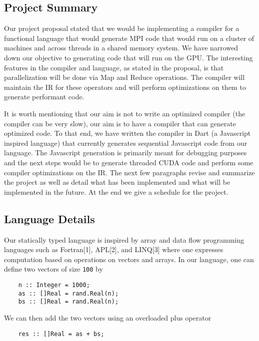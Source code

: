 \subsection{Project Summary}

Our project proposal stated that we would be implementing a compiler for
a functional language that would generate MPI code that would run on a
cluster of machines and across threads in a shared memory system. We
have narrowed down our objective to generating code that will run on the
GPU. The interesting features in the compiler and language, as stated in
the proposal, is that parallelization will be done via Map and Reduce
operations. The compiler will maintain the IR for these operators and
will perform optimizations on them to generate performant code.

It is worth mentioning that our aim is not to write an optimized
compiler (the compiler can be very slow), our aim is to have a compiler
that can generate optimized code. To that end, we have written the
compiler in Dart (a Javascript inspired language) that currently
generates sequential Javascript code from our language. The Javascript
generation is primarily meant for debugging purposes and the next steps
would be to generate threaded CUDA code and perform some compiler
optimizations on the IR. The next few paragraphs revise and summarize
the project as well as detail what has been implemented and what will be
implemented in the future. At the end we give a schedule for the
project.

\subsection{Language Details}

Our statically typed language is inspired by array and data flow
programming languages such as Fortran{[}1{]}, APL{[}2{]}, and
LINQ{[}3{]} where one expresses computation based on operations on
vectors and arrays. In our language, one can define two vectors of size
\texttt{100} by

\begin{verbatim}
    n :: Integer = 1000;
    as :: []Real = rand.Real(n);
    bs :: []Real = rand.Real(n); 
\end{verbatim}

We can then add the two vectors using an overloaded plus operator

\begin{verbatim}
    res :: []Real = as + bs;
\end{verbatim}

